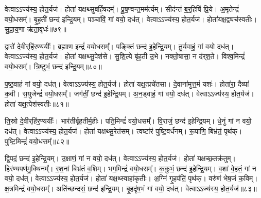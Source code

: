 वेत्वा\-ऽ\-ऽ\-ज्य॑स्य॒ होत॒र्यज॑।
होता॑ यक्षथ्सुबर्\mbox{}हि॒षदम्᳚।
पू॒ष॒ण्वन्त॒मम॑र्त्यम्।
सीद॑न्तं ब॒र्॒हिषि॑ प्रि॒ये।
अ॒मृतेन्द्रं॑ वयो॒धसम्᳚।
बृ॒ह॒तीं छन्द॑ इन्द्रि॒यम्।
पञ्चा॑विं॒ गां वयो॒ दध॑त्।
वेत्वा\-ऽ\-ऽ\-ज्य॑स्य॒ होत॒र्यज॑।
होता॑यक्ष॒द्व्यच॑स्वतीः।
सु॒प्रा॒य॒णा ऋ॑ता॒वृधः॑॥७९॥\ip

द्वारो॑ दे॒वीर्‌\mbox{}हि॑र॒ण्ययीः᳚।
ब्र॒ह्माण॒ इन्द्रं॑ वयो॒धसम्᳚।
प॒ङ्क्तिं छन्द॑ इ॒हेन्द्रि॒यम्।
तु॒र्य॒वाहं॒ गां वयो॒ दध॑त्।
वेत्वा\-ऽ\-ऽ\-ज्य॑स्य॒ होत॒र्यज॑।
होता॑ यक्षथ्सु॒पेश॑से।
सु॒शि॒ल्पे बृ॑ह॒ती उ॒भे।
नक्तो॒षासा॒ न द॑र्‌\mbox{}श॒ते।
विश्व॒मिन्द्रं॑ वयो॒धसम्᳚।
त्रि॒ष्टुभं॒ छन्द॑ इन्द्रि॒यम्॥८०॥\ip

प॒ष्ठ॒वाहं॒ गां वयो॒ दध॑त्।
वेत्वा\-ऽ\-ऽ\-ज्य॑स्य॒ होत॒र्यज॑।
होता॑ यक्ष॒त्प्रचे॑तसा।
दे॒वाना॑मुत्त॒मं यशः॑।
होता॑रा॒ दैव्या॑ क॒वी।
स॒युजेन्द्रं॑ वयो॒धसम्᳚।
जग॑तीं॒ छन्द॑ इ॒हेन्द्रि॒यम्।
अ॒न॒ड्वाहं॒ गां वयो॒ दध॑त्।
वेत्वा\-ऽ\-ऽ\-ज्य॑स्य॒ होत॒र्यज॑।
होता॑ यक्ष॒त्पेश॑स्वतीः॥८१॥\ip

ति॒स्रो दे॒वीर्‌\mbox{}हि॑र॒ण्ययीः᳚।
भार॑तीर्बृह॒तीर्म॒हीः।
पति॒मिन्द्रं॑ वयो॒धसम्᳚।
वि॒राजं॒ छन्द॑ इ॒हेन्द्रि॒यम्।
धे॒नुं गां न वयो॒ दध॑त्।
वेत्वा\-ऽ\-ऽ\-ज्य॑स्य॒ होत॒र्यज॑।
होता॑ यक्षथ्सु॒रेत॑सम्।
त्वष्टा॑रं पुष्टि॒वर्ध॑नम्।
रू॒पाणि॒ बिभ्र॑तं॒ पृथ॑क्।
पुष्टि॒मिन्द्रं॑ वयो॒धसम्᳚॥८२॥\ip

द्वि॒पदं॒ छन्द॑ इ॒हेन्द्रि॒यम्।
उ॒क्षाणं॒ गां न वयो॒ दध॑त्।
वेत्वा\-ऽ\-ऽ\-ज्य॑स्य॒ होत॒र्यज॑।
होता॑ यक्षच्छ॒तक्र॑तुम्।
हिर॑ण्य\-पर्ण\-मु॒क्थिनम्᳚।
र॒श॒नां बिभ्र॑तं व॒शिम्।
भग॒मिन्द्रं॑ वयो॒धसम्᳚।
क॒कुभं॒ छन्द॑ इ॒हेन्द्रि॒यम्।
व॒शां वे॒हतं॒ गां न वयो॒ दध॑त्।
वेत्वा\-ऽ\-ऽ\-ज्य॑स्य॒ होत॒र्यज॑।
होता॑ यक्ष॒थ्स्वाहा॑कृतीः।
अ॒ग्निं गृ॒हप॑तिं॒ पृथ॑क्।
वरु॑णं भेष॒जं क॒विम्।
क्ष॒त्रमिन्द्रं॑ वयो॒धसम्᳚।
अति॑च्छन्दसं॒ छन्द॑ इन्द्रि॒यम्।
बृ॒हदृ॑ष॒भं गां वयो॒ दध॑त्।
वेत्वा\-ऽ\-ऽ\-ज्य॑स्य॒ होत॒र्यज॑॥८३॥\ip{}

